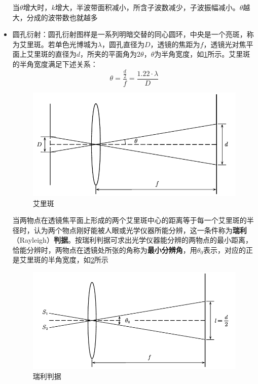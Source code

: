 \documentclass[12pt, a4paper, twoside]{ctexbook}
\begin{document}
\begin{itemize}
    当$\theta$增大时，$k$增大，半波带面积减小，所含子波数减少，子波振幅减小。$\theta$越大，分成的波带数也就越多
    \item {\sonti 圆孔衍射}：圆孔衍射图样是一系列明暗交替的同心圆环，中央是一个亮斑，称为艾里斑。若单色光博城为$\lambda$，圆孔直径为$D$，透镜的焦距为$f$，透镜光对焦平面上艾里斑的直径为$d$，所夹的平面角为$2\theta$，$\theta$为半角宽度，如\textcolor{blue}{\cref{fig:艾里斑}}所示。艾里斑的半角宽度满足下述关系：
    $$
    \theta=\frac{\frac{d}{2}}{f}=\frac{1.22\cdot\lambda}{D}
    $$
    \begin{figure}[H]
        \centerline{\includegraphics[scale=0.90]{艾里斑.pdf}}
        \caption{艾里斑}\label{fig:艾里斑}
    \end{figure}
    当两物点在透镜焦平面上形成的两个艾里斑中心的距离等于每一个艾里斑的半径时，认为两个物点刚好能被人眼或光学仪器所能分辨，这一条件称为\textbf{瑞利}{\sonti （Rayleigh）}\textbf{判据}。按瑞利判据可求出光学仪器能分辨的两物点的最小距离，恰能分辨时，两物点在透镜处所张的角称为\textbf{最小分辨角}，用$\theta_0$表示，对应的正是艾里斑的半角宽度，如\textcolor{blue}{\cref{fig:瑞利判据}}所示
    \begin{figure}[H]
        \centerline{\includegraphics[scale=0.90]{瑞利判据.pdf}}
        \caption{瑞利判据}\label{fig:瑞利判据}
    \end{figure}

\end{itemize}
\end{document}
